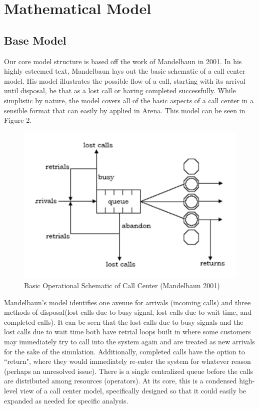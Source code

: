 \documentclass[12pt,twocolumn]{article}
\begin{document}
\section{Mathematical Model}

	\subsection{Base Model}
Our core model structure is based off the work of Mandelbaun in 2001\cite{mandelbaun}.  In his highly esteemed text, Mandelbaun lays out the basic schematic of a call center model.  His model illustrates the possible flow of a call, starting with its arrival until disposal, be that as a lost call or having completed successfully.  While simplistic by nature, the model covers all of the basic aspects of a call center in a sensible format that can easily by applied in Arena.  This model can be seen in Figure 2.  

	\begin{figure}[h]
	\includegraphics[scale=.45]{call_center_layout.png}
	\caption{Basic Operational Schematic of Call Center (Mandelbaun 2001)}
	\end{figure}

Mandelbaun's model identifies one avenue for arrivals (incoming calls) and three methods of disposal(lost calls due to busy signal, lost calls due to wait time, and completed calls).  It can be seen that the lost calls due to busy signals and the lost calls due to wait time both have retrial loops built in where some customers may immediately try to call into the system again and are treated as new arrivals for the sake of the simulation.  Additionally, completed calls have the option to ``return", where they would immediately re-enter the system for whatever reason (perhaps an unresolved issue).  There is a single centralized queue before the calls are distributed among resources (operators).  At its core, this is a condensed high-level view of a call center model, specifically designed so that it could easily be expanded as needed for specific analysis.
\end{document}
